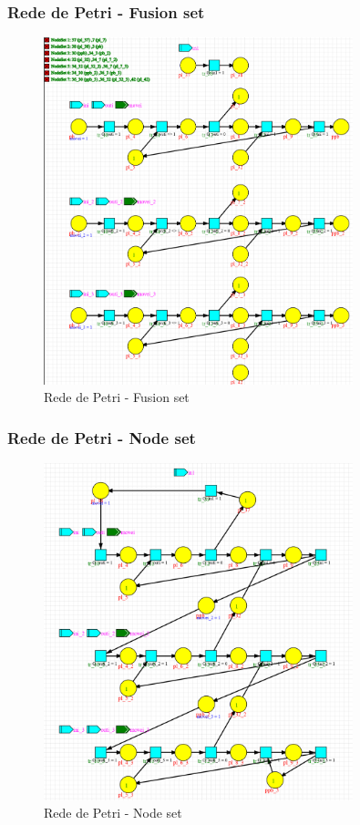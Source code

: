 \subsubsection{Rede de Petri - Fusion set}
\begin{figure}[H]
    \centering
    \includegraphics[width=0.8\textwidth]{img/petri_model_merge.png}
    \caption{Rede de Petri - Fusion set}
    \label{fig:petri_fusion_set}
\end{figure}

\subsubsection{Rede de Petri - Node set}
\begin{figure}[H]
    \centering
    \includegraphics[width=0.8\textwidth]{img/petri_node_set.png}
    \caption{Rede de Petri - Node set}
    \label{fig:petri_node_set}
\end{figure}

